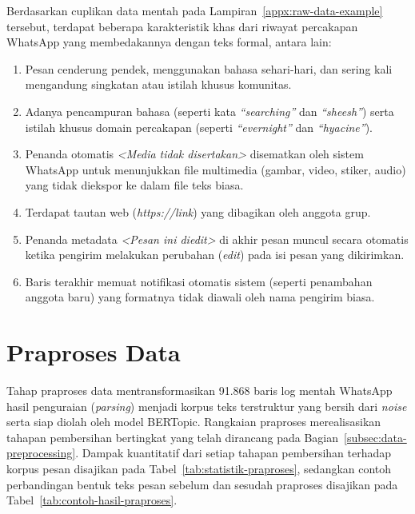 Berdasarkan cuplikan data mentah pada Lampiran~\ref{appx:raw-data-example} tersebut, terdapat beberapa karakteristik khas dari riwayat percakapan WhatsApp yang membedakannya dengan teks formal, antara lain:
\begin{enumerate}[nosep]
    \item Pesan cenderung pendek, menggunakan bahasa sehari-hari, dan sering kali mengandung singkatan atau istilah khusus komunitas.
    \item Adanya pencampuran bahasa (seperti kata \textit{``searching''} dan \textit{``sheesh''}) serta istilah khusus domain percakapan (seperti \textit{``evernight''} dan \textit{``hyacine''}).
    \item Penanda otomatis \textit{<Media tidak disertakan>} disematkan oleh sistem WhatsApp untuk menunjukkan file multimedia (gambar, video, stiker, audio) yang tidak diekspor ke dalam file teks biasa.
    \item Terdapat tautan web (\textit{https://link}) yang dibagikan oleh anggota grup.
    \item Penanda metadata \textit{<Pesan ini diedit>} di akhir pesan muncul secara otomatis ketika pengirim melakukan perubahan (\textit{edit}) pada isi pesan yang dikirimkan.
    \item Baris terakhir memuat notifikasi otomatis sistem (seperti penambahan anggota baru) yang formatnya tidak diawali oleh nama pengirim biasa.
\end{enumerate}

\section{Praproses Data}
\label{sec:preprocessing}

Tahap praproses data mentransformasikan 91.868 baris log mentah WhatsApp hasil penguraian (\textit{parsing}) menjadi korpus teks terstruktur yang bersih dari \textit{noise} serta siap diolah oleh model BERTopic. Rangkaian praproses merealisasikan tahapan pembersihan bertingkat yang telah dirancang pada Bagian~\ref{subsec:data-preprocessing}. Dampak kuantitatif dari setiap tahapan pembersihan terhadap korpus pesan disajikan pada Tabel~\ref{tab:statistik-praproses}, sedangkan contoh perbandingan bentuk teks pesan sebelum dan sesudah praproses disajikan pada Tabel~\ref{tab:contoh-hasil-praproses}.





